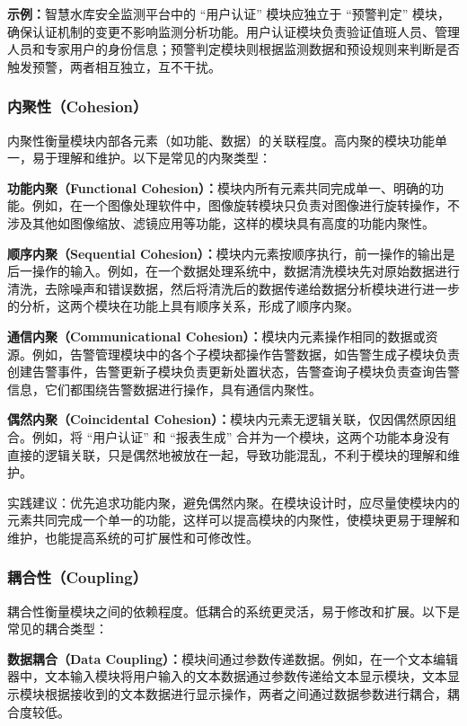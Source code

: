 \textbf{示例：}智慧水库安全监测平台中的 “用户认证” 模块应独立于 “预警判定” 模块，确保认证机制的变更不影响监测分析功能。用户认证模块负责验证值班人员、管理人员和专家用户的身份信息；预警判定模块则根据监测数据和预设规则来判断是否触发预警，两者相互独立，互不干扰。

\subsubsection{内聚性（Cohesion）}
内聚性衡量模块内部各元素（如功能、数据）的关联程度。高内聚的模块功能单一，易于理解和维护。以下是常见的内聚类型：

\textbf{功能内聚（Functional Cohesion）：}模块内所有元素共同完成单一、明确的功能。例如，在一个图像处理软件中，图像旋转模块只负责对图像进行旋转操作，不涉及其他如图像缩放、滤镜应用等功能，这样的模块具有高度的功能内聚性。

\textbf{顺序内聚（Sequential Cohesion）：}模块内元素按顺序执行，前一操作的输出是后一操作的输入。例如，在一个数据处理系统中，数据清洗模块先对原始数据进行清洗，去除噪声和错误数据，然后将清洗后的数据传递给数据分析模块进行进一步的分析，这两个模块在功能上具有顺序关系，形成了顺序内聚。

\textbf{通信内聚（Communicational Cohesion）：}模块内元素操作相同的数据或资源。例如，告警管理模块中的各个子模块都操作告警数据，如告警生成子模块负责创建告警事件，告警更新子模块负责更新处置状态，告警查询子模块负责查询告警信息，它们都围绕告警数据进行操作，具有通信内聚性。

\textbf{偶然内聚（Coincidental Cohesion）：}模块内元素无逻辑关联，仅因偶然原因组合。例如，将 “用户认证” 和 “报表生成” 合并为一个模块，这两个功能本身没有直接的逻辑关联，只是偶然地被放在一起，导致功能混乱，不利于模块的理解和维护。

实践建议：优先追求功能内聚，避免偶然内聚。在模块设计时，应尽量使模块内的元素共同完成一个单一的功能，这样可以提高模块的内聚性，使模块更易于理解和维护，也能提高系统的可扩展性和可修改性。

\subsubsection{耦合性（Coupling）}
耦合性衡量模块之间的依赖程度。低耦合的系统更灵活，易于修改和扩展。以下是常见的耦合类型：

\textbf{数据耦合（Data Coupling）：}模块间通过参数传递数据。例如，在一个文本编辑器中，文本输入模块将用户输入的文本数据通过参数传递给文本显示模块，文本显示模块根据接收到的文本数据进行显示操作，两者之间通过数据参数进行耦合，耦合度较低。

